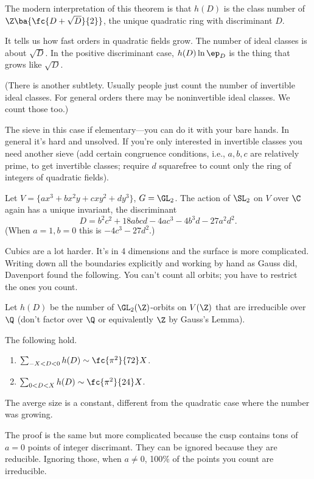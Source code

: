 The modern interpretation of this theorem is that $h(D)$ is the class number of $\Z\ba{\fc{D+\sqrt D}{2}}$, the unique quadratic ring with discriminant $D$. %

It tells us how fast orders in quadratic fields grow.  The number of ideal classes is about $\sqrt D$. In the positive discriminant case, $h(D)\ln \ep_D$ is the thing that grows like $\sqrt D$.

(There is another subtlety. Usually people just count the number of invertible ideal classes. For general orders there may be noninvertible ideal classes. We count those too.)

The sieve in this case if elementary---you can do it with your bare hands. In general it's hard and unsolved. If you're only interested in invertible classes you need another sieve (add certain congruence conditions, i.e., $a,b,c$ are relatively prime, to get invertible classes; require $d$ squarefree to count only the ring of integers of quadratic fields).

\begin{ex}
Let $V=\{ax^3 + bx^2y + cxy^2 + dy^3\}$, $G=\GL_2$. The action of $\SL_2$ on $V$ over $\C$ again has a unique invariant, the discriminant
\[
D = b^2c^2 + 18 abcd - 4 ac^3 - 4 b^3d - 27 a^2 d^2.
\]
(When $a=1,b=0$ this is $-4c^3-27d^2$.)
\end{ex}
Cubics are a lot harder. It's in 4 dimensions and the surface is more complicated. Writing down all the boundaries explicitly and working by hand as Gauss did, Davenport found the following. You can't count all orbits; you have to restrict the ones you count.

Let $h(D)$ be the number of $\GL_2(\Z)$-orbits on $V(\Z)$ that are irreducible over $\Q$ (don't factor over $\Q$ or equivalently $\Z$ by Gauss's Lemma). 
\begin{thm}[Davenport, 1960s]\label{thm:davenport}
The following hold.
\begin{enumerate}
\item
$\sum_{-X<D<0} h(D)\sim \fc{\pi^2}{72}X$.
\item
$\sum_{0<D<X} h(D) \sim \fc{\pi^2}{24}X$.
\end{enumerate}
\end{thm}
The averge size is a constant, different from the quadratic case where the number was growing.

The proof is the same but more complicated because the cusp contains tons of $a=0$ points of integer discrimant. They can be ignored because they are reducible. Ignoring those, when $a\ne 0$, 100$\%$ of the points you count are irreducible. 

